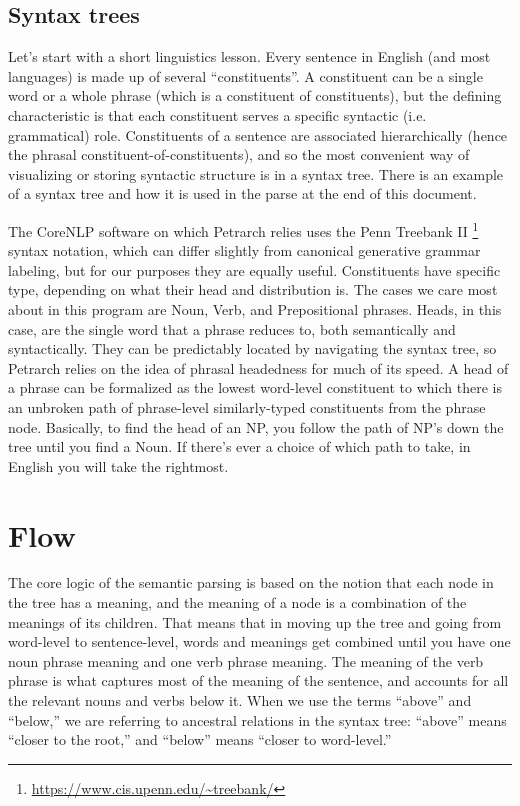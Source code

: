 \documentclass[11pt]{article}
\begin{document}
\subsection{Syntax trees}
Let's start with a short linguistics lesson. Every sentence in English (and most languages) is made up of several ``constituents''. A constituent can be a single 
word or a whole phrase (which is a constituent of constituents), but the defining 
characteristic is that each constituent serves a specific syntactic (i.e. grammatical) role. 
Constituents of a sentence are associated hierarchically (hence the phrasal constituent-of-constituents),
 and so the most convenient way of visualizing or storing syntactic structure 
is in a syntax tree. There is an example of a syntax tree and how it is used in 
the parse at the end of this document. 

The CoreNLP software on which Petrarch relies 
uses the Penn Treebank II \footnote{\url{https://www.cis.upenn.edu/~treebank/}} syntax notation, which can differ slightly from canonical 
generative grammar labeling, but for our purposes they are equally useful. 
Constituents have specific type, depending on what their head and distribution 
is. The cases we care most about in this program are Noun, Verb, and 
Prepositional phrases. Heads, in this case, are the single word that a phrase 
reduces to, both semantically and syntactically. They can be predictably located 
by navigating the syntax tree, so Petrarch relies on the idea of phrasal headedness 
for much of its speed. A head of a phrase can be formalized as the lowest word-level constituent
to which there is an unbroken path of phrase-level similarly-typed constituents from the phrase 
node. Basically, to find the head of an NP, you follow the path of NP's down the 
tree until you find a Noun. If there's ever a choice of which path to take, in English you will
take the rightmost.   

 \section{Flow}
The core logic of the semantic parsing is based on the notion that each node in the 
tree has a meaning, and the meaning of a node is a combination of the meanings 
of its children. That means that in moving up the tree and going from word-level to 
sentence-level, words and meanings get combined until you have one noun phrase 
meaning and one verb phrase meaning. The meaning of the verb phrase is what captures 
most of the meaning of the sentence, and accounts for all the relevant nouns and 
verbs below it. When we use the terms ``above'' and ``below,'' we are referring 
to ancestral relations in the syntax tree: ``above'' means ``closer to the 
root,'' and ``below'' means ``closer to word-level.''
\end{document}
